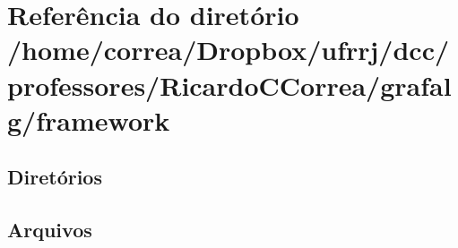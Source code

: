 \section{Referência do diretório /home/correa/\+Dropbox/ufrrj/dcc/professores/\+Ricardo\+C\+Correa/grafalg/framework}
\label{dir_ca201bc4c7a63cc1773bd80b9786d316}
\subsection*{Diretórios}
\begin{DoxyCompactItemize}
\end{DoxyCompactItemize}
\subsection*{Arquivos}
\begin{DoxyCompactItemize}
\end{DoxyCompactItemize}
